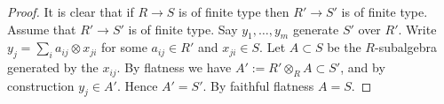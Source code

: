 \documentclass[10pt,a4paper]{amsart}
\theoremstyle{plain}
\theoremstyle{definition}
\theoremstyle{remark}
\numberwithin{equation}{subsection}
\begin{document}
\begin{proof}
It is clear that if $R \to S$ is of finite type then $R' \to S'$
is of finite type. Assume that $R' \to S'$ is of finite type.
Say $y_1, \ldots, y_m$ generate $S'$ over $R'$.
Write $y_j = \sum_i a_{ij} \otimes x_{ji}$ for some
$a_{ij} \in R'$ and $x_{ji} \in S$. Let $A \subset S$
be the $R$-subalgebra generated by the $x_{ij}$.
By flatness we have $A' := R' \otimes_R A \subset S'$, and
by construction $y_j \in A'$. Hence $A' = S'$.
By faithful flatness $A = S$.
\end{proof}
\end{document}
